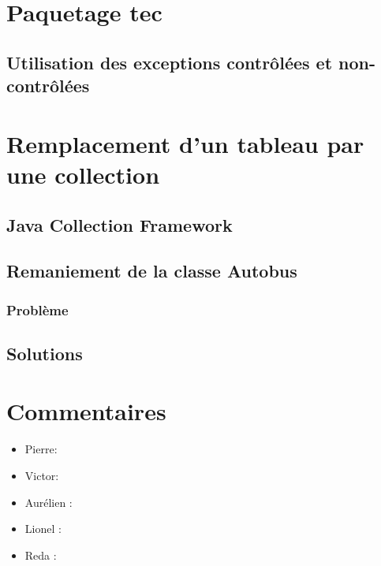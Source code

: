 \documentclass[a4paper,11pt]{article}
\begin{document}
\section{Paquetage tec}

\subsection{Utilisation des exceptions contrôlées et non-contrôlées}

\section{Remplacement d'un tableau par une collection}

\subsection{Java Collection Framework}


\subsection{Remaniement de la classe Autobus}
\subsubsection{Problème}

\subsection{Solutions}
\section{Commentaires}

\begin{itemize}
\item Pierre:
\item Victor:
\item Aurélien :
\item Lionel :
\item Reda :
\end{itemize}
\end{document}
